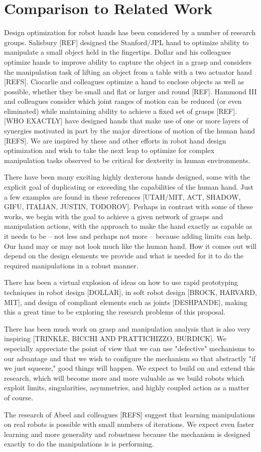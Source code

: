 \section{Comparison to Related Work}

Design optimization for robot hands has been considered by a number of research groups.   Salisbury [REF] designed the Stanford/JPL hand to optimize ability to manipulate a small object held in the fingertips.  Dollar and his colleagues optimize hands to improve ability to capture the object in a grasp and considers the manipulation task of lifting an object from a table with a two actuator hand [REFS].     Ciocarlie and colleagues optimize a hand to enclose objects as well as possible, whether they be small and flat or larger and round [REF].    Hammond III and colleagues consider which joint ranges of motion can be reduced (or even eliminated) while maintaining ability to achieve a fixed set of grasps [REF].   [WHO EXACTLY] have designed hands that make use of one or more layers of synergies motivated in part by the major directions of motion of the human hand [REFS].    
We are inspired by these and other efforts in robot hand design optimization and wish to take the next leap to optimize for complex manipulation tasks observed to be critical for dexterity in human environments.

There have been many exciting highly dexterous hands designed, some with the explicit goal of duplicating or exceeding the capabilities of the human hand.   Just a few examples are found in these references [UTAH/MIT, ACT, SHADOW, GIFU, ITALIAN, JUSTIN, TODOROV].    Perhaps in contrast with some of these works, we begin with the goal to achieve a given network of grasps and manipulation actions, with the approach to make the hand exactly as capable as it needs to be -- not less and perhaps not more -- because adding limits can help.   Our hand may or may not look much like the human hand.   How it comes out will depend on the design elements we provide and what is needed for it to do the required manipulations in a robust manner.

There has been a virtual explosion of ideas on how to use rapid prototyping techniques in robot design [DOLLAR], in soft robot design [BROCK, HARVARD, MIT], and design of compliant elements such as joints [DESHPANDE], making this a great time to be exploring the research problems of this proposal.

There has been much work on grasp and manipulation analysis that is also very inspiring [TRINKLE, BICCHI AND PRATTICHIZZO, BURDICK].   We especially appreciate the point of view that we can use "defective" mechanisms to our advantage and that we wish to configure the mechanism so that abstractly "if we just squeeze," good things will happen.    We expect to build on and extend this research, which will become more and more valuable as we build robots which exploit limits, singularities, asymmetries, and highly coupled action as a matter of course.

The research of Abeel and colleagues [REFS] suggest that learning manipulations on real robots is possible with small numbers of iterations.   We expect even faster learning and more generality and robustness because the mechanism is designed exactly to do the manipulations is is performing.